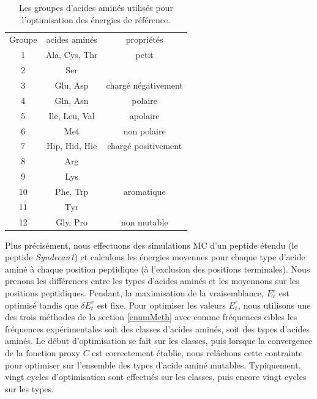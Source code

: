     \begin{table}[!htbp]
      \centering

      \begin{tabular}{ccc}

        \toprule
        Groupe & acides aminés & propriétés\\
        \cmidrule{1-3}

        1   & Ala, Cys, Thr & petit\\
        2   & Ser &\\
        \cmidrule{1-3}
        3   & Glu, Asp & chargé négativement\\
        \cmidrule{1-3}
        4   & Gln, Asn & polaire\\
        \cmidrule{1-3}
        5   & Ile, Leu, Val & apolaire\\
        \cmidrule{1-3}
        6   & Met & non polaire\\
        \cmidrule{1-3}
        7   & Hip, Hid, Hie & chargé positivement\\
        8   & Arg \\
        9   & Lys \\
        \cmidrule{1-3}
        10  & Phe, Trp & aromatique\\
        11  & Tyr \\
        \cmidrule{1-3}
        12  & Gly, Pro & non mutable\\
        \bottomrule


      \end{tabular}      
      \caption{Les groupes d'acides aminés utilisés pour l'optimisation des énergies de référence.}
\label{tab:AAgroups}      
    \end{table}

Plus précisément, nous effectuons des simulations MC d'un peptide étendu (le peptide \textit{Syndecan1}) et calculons les énergies moyennes pour chaque type d'acide aminé à chaque position peptidique (à l'exclusion des positions terminales). Nous prenons les différences entre les types d'acides aminés et les moyennons sur les positions peptidiques.
Pendant, la maximisation de la vraisemblance, $E_c^r$ est optimisé tandis que $\delta E_t^r$ est fixe. Pour optimiser les valeurs $E^r_t$, nous utilisons une des trois méthodes de la section \ref{enumMeth} avec comme fréquences cibles les fréquences expérimentales soit des classes d'acides aminés, soit des types d'acides aminés. Le  début d'optimisation se fait sur les classes, puis lorsque la convergence de la fonction proxy $C$ est correctement établie, nous relâchons cette contrainte pour optimiser sur l'ensemble des types d'acide aminé mutables. Typiquement, vingt cycles d'optimisation sont effectués sur les classes, puis encore vingt cycles sur les types.  

